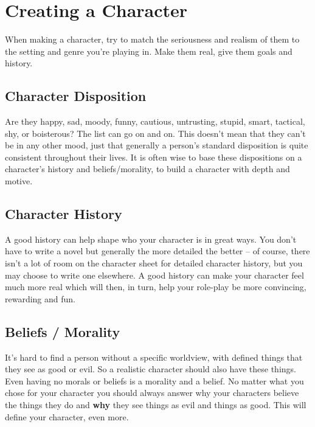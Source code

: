 \section{Creating a Character} \label{sec:creating_a_character}

When making a character, try to match the seriousness and realism of them to the setting and genre you’re playing in. Make them real, give them goals and history. %


\subsection{Character Disposition} \label{subsec:character_disposition}

Are they happy, sad, moody, funny, cautious, untrusting, stupid, smart, tactical, shy, or boisterous? The list can go on and on. This doesn’t mean that they can’t be in any other mood, just that generally a person’s standard disposition is quite consistent throughout their lives. It is often wise to base these dispositions on a character’s history and beliefs/morality, to build a character with depth and motive.

\subsection{Character History} \label{subsec:character_history}

A good history can help shape who your character is in great ways. You don’t have to write a novel but generally the more detailed the better – of course, there isn’t a lot of room on the character sheet for detailed character history, but you may choose to write one elsewhere. A good history can make your character feel much more real which will then, in turn, help your role-play be more convincing, rewarding and fun.

\subsection{Beliefs / Morality} \label{subsec:beliefs_morality}

It’s hard to find a person without a specific worldview, with defined things that they see as good or evil. So a realistic character should also have these things. Even having no morals or beliefs is a morality and a belief. No matter what you chose for your character you should always answer why your characters believe the things they do and \textbf{why} they see things as evil and things as good. This will define your character, even more.

